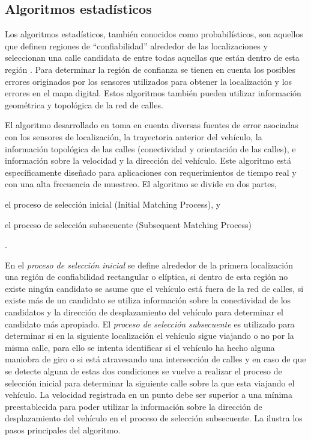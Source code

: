 \subsection{Algoritmos estadísticos}

Los algoritmos estadísticos, también conocidos como probabilísticos, son aquellos que definen regiones de “confiabilidad” alrededor de las localizaciones y seleccionan una calle candidata de entre todas aquellas que están dentro de esta región \cite{quddus2007current}. Para determinar la región de confianza se tienen en cuenta los posibles errores originados por los sensores utilizados para obtener la localización y los errores en el mapa digital. Estos algoritmos también pueden utilizar información geométrica y topológica de la red de calles.

El algoritmo desarrollado en \cite{ochieng2009map} toma en cuenta diversas fuentes de error asociadas con los sensores de localización, la trayectoria anterior del vehículo, la información topológica de las calles (conectividad y orientación de las calles), e información sobre la velocidad y la dirección del vehículo. Este algoritmo está específicamente diseñado para aplicaciones con requerimientos de tiempo real y con una alta frecuencia de muestreo. El algoritmo se divide en dos partes, \begin{enumerate*}[a)]
\item el proceso de selección inicial (Initial Matching Process), y \item el proceso de selección subsecuente (Subsequent Matching Process)\end{enumerate*}. 

En el \emph{proceso de selección inicial} se define alrededor de la primera localización una región de confiabilidad rectangular o elíptica, si dentro de esta región no existe ningún candidato se asume que el vehículo está fuera de la red de calles, si existe más de un candidato se utiliza información sobre la conectividad de los candidatos y la dirección de desplazamiento del vehículo para determinar el candidato más apropiado. El \emph{proceso de selección  subsecuente} es utilizado para determinar si en la siguiente localización el vehículo sigue viajando o no por la misma calle, para ello se intenta identificar si el vehículo ha hecho alguna maniobra de giro o si está atravesando una intersección de calles y en caso de que se detecte alguna de estas dos condiciones se vuelve a realizar el proceso de selección inicial para determinar la siguiente calle sobre la que esta viajando el vehículo. La velocidad registrada en un punto debe ser superior a una mínima preestablecida para poder utilizar la información sobre la dirección de desplazamiento del vehículo en el proceso de selección subsecuente. La  ilustra los pasos principales del algoritmo.

